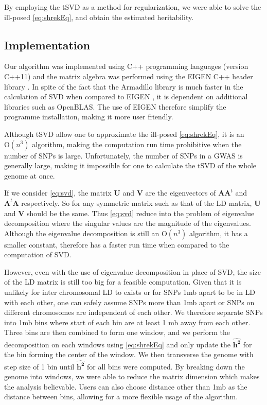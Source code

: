 			By employing the \gls{tSVD} as a method for regularization, we were able to solve the ill-posed \cref{eq:shrekEq}, and obtain the estimated heritability.
		\subsection{Implementation}
			Our algorithm was implemented using C++ programming languages (version C++11) and the matrix algebra was performed using the EIGEN C++ header library \citep{eigenweb}.
			In spite of the fact that the Armadillo library \citep{Sanderson2010} is much faster in the calculation of \gls{SVD} when compared to EIGEN \citep{Ho2011}, it is dependent on additional libraries such as OpenBLAS. 
			The use of EIGEN therefore simplify the programme installation, making it more user friendly. 
			
			Although \gls{tSVD} allow one to approximate the ill-posed \cref{eq:shrekEq}, it is an $\mathrm{O}(n^3)$ algorithm, making the computation run time prohibitive when the number of \glspl{SNP} is large.
			Unfortunately, the number of \glspl{SNP} in a \gls{GWAS} is generally large, making it impossible for one to calculate the \gls{tSVD} of the whole genome at once. 
			
			If we consider \cref{eq:svd}, the matrix $\boldsymbol{U}$ and $\boldsymbol{V}$ are the eigenvectors of $\boldsymbol{AA}^t$ and $\boldsymbol{A}^t\boldsymbol{A}$ respectively. 
			So for any symmetric matrix such as that of the \gls{LD} matrix, $\boldsymbol{U}$ and $\boldsymbol{V}$ should be the same. 
			Thus \cref{eq:svd} reduce into the problem of eigenvalue decomposition where the singular values are the magnitude of the eigenvalues. 
			Although the eigenvalue decomposition is still an $\mathrm{O}(n^3)$ algorithm, it has a smaller constant, therefore has a faster run time when compared to the computation of \gls{SVD}. 
			
			However, even with the use of eigenvalue decomposition in place of \gls{SVD}, the size of the \gls{LD} matrix is still too big for a feasible computation. 
			Given that it is unlikely for inter chromosomal \gls{LD} to exists or for \glspl{SNP} 1\gls{mb} apart to be in \gls{LD} with each other, one can safely assume \glspl{SNP} more than 1\gls{mb} apart or \glspl{SNP} on different chromosomes are independent of each other. 
			We therefore separate \glspl{SNP} into 1\gls{mb} bins where start of each bin are at least 1 \gls{mb} away from each other. 
			Three bins are then combined to form one window, and we perform the decomposition on each windows using \cref{eq:shrekEq} and only update the $\boldsymbol{\hat{h^2}}$ for the bin forming the center of the window.
			We then transverse the genome with step size of 1 bin until $\boldsymbol{\hat{h^2}}$ for all bins were computed. 
			By breaking down the genome into windows, we were able to reduce the matrix dimension which makes the analysis believable.
			Users can also choose distance other than 1\gls{mb} as the distance between bins, allowing for a more flexible usage of the algorithm.
			
